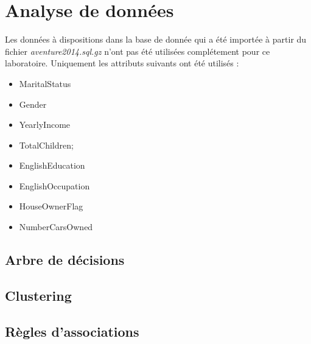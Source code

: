 \chapter{Analyse de données}

Les données à dispositions dans la base de donnée qui a été importée à partir du fichier \textit{aventure2014.sql.gz} n'ont pas été utilisées complétement pour ce laboratoire. Uniquement les attributs suivants ont été utilisés :

\begin{itemize}
	\item MaritalStatus
	\item Gender
	\item YearlyIncome
	\item TotalChildren;
	\item EnglishEducation
	\item EnglishOccupation
	\item HouseOwnerFlag
	\item NumberCarsOwned
\end{itemize}


\section{Arbre de décisions}


\section{Clustering}


\section{Règles d'associations}

